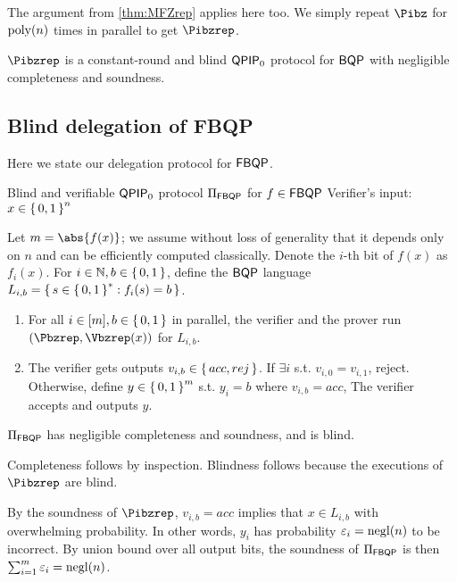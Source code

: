 The argument from \cref{thm:MFZrep} applies here too. We simply repeat $\Pibz$ for $\operatorname*{\operatorname{poly}}(n)$ times in parallel to get $\Pibzrep$.

\begin{thm}
	\label{thm:QPIP0BQP}
	$\Pibzrep$ is a constant-round and blind $\operatorname{\mathsf{QPIP}}_0$ protocol for $\operatorname{\mathsf{BQP}}$ with negligible completeness and soundness.
\end{thm}

\subsection{Blind delegation of FBQP}
\label{subsec:BlindFBQP}

Here we state our delegation protocol for $\operatorname{\mathsf{FBQP}}$.

\begin{protocol}{Blind and verifiable $\operatorname{\mathsf{QPIP}}_0$ protocol $\Pi_{\operatorname{\mathsf{FBQP}}}$ for $f\in\operatorname{\mathsf{FBQP}}$}
	\label{proto:QPIP0FBQP}
	Verifier's input: $x\in\set{0, 1}^n$

	Let $m=\abs{f(x)}$; we assume without loss of generality that it depends only on $n$ and can be efficiently computed classically.
	Denote the $i$-th bit of $f(x)$ as $f_i(x)$.
	For $i\in\mathbb{N}, b\in\set{0,1}$, define the $\operatorname{\mathsf{BQP}}$ language $L_{i, b}=\set{s\in\set{0,1}^* : f_i(s)=b}$.
	\begin{enumerate}
		\item For all $i\in[m], b\in\set{0, 1}$ in parallel, the verifier and the prover run $(\Pbzrep, \Vbzrep(x))$ for $L_{i, b}$.
		\item The verifier gets outputs $v_{i, b}\in\set{acc, rej}$.
			If $\exists i$ s.t. $v_{i,0}=v_{i,1}$, reject.
			Otherwise, define $y\in\set{0,1}^m$ s.t. $y_i = b$ where $v_{i, b}=acc$,
			The verifier accepts and outputs $y$.
	\end{enumerate}
\end{protocol}

\begin{theorem}
	$\Pi_{\operatorname{\mathsf{FBQP}}}$ has negligible completeness and soundness, and is blind.
\end{theorem}
\begin{prf}
	Completeness follows by inspection.
	Blindness follows because the executions of $\Pibzrep$ are blind.

	By the soundness of $\Pibzrep$, $v_{i, b}=acc$ implies that $x\in L_{i, b}$ with overwhelming probability.
	In other words, $y_i$ has probability $\varepsilon_i=\operatorname{negl}(n)$ to be incorrect.
	By union bound over all output bits, the soundness of $\Pi_{\operatorname{\mathsf{FBQP}}}$ is then
	$\sum_{i=1}^m \varepsilon_i=\operatorname{negl}(n)$.
\end{prf}
